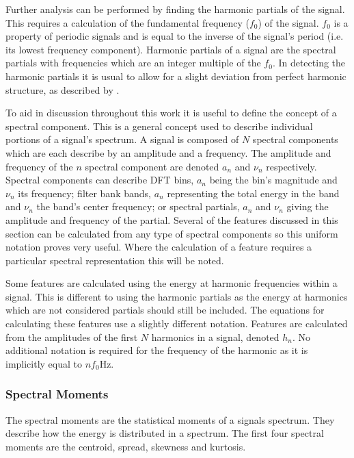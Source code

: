 		Further analysis can be performed by finding the harmonic partials of the signal. This requires a
		calculation of the fundamental frequency ($f_{0}$) of the signal. $f_{0}$ is a property of periodic signals
		and is equal to the inverse of the signal's period (i.e. its lowest frequency component). Harmonic partials
		of a signal are the spectral partials with frequencies which are an integer multiple of the $f_{0}$. In
		detecting the harmonic partials it is usual to allow for a slight deviation from perfect harmonic structure,
		as described by \citet{peeters2011the}.

		To aid in discussion throughout this work it is useful to define the concept of a spectral component. This
		is a general concept used to describe individual portions of a signal's spectrum. A signal is composed of
		$N$ spectral components which are each describe by an amplitude and a frequency. The amplitude and frequency
		of the $n$ spectral component are denoted $a_{n}$ and $\nu_{n}$ respectively. Spectral components
		can describe DFT bins, $a_{n}$ being the bin's magnitude and $\nu_{n}$ its frequency; filter bank bands,
		$a_{n}$ representing the total energy in the band and $\nu_{n}$ the band's center frequency; or spectral
		partials, $a_{n}$ and $\nu_{n}$ giving the amplitude and frequency of the partial. Several of the features
		discussed in this section can be calculated from any type of spectral components so this uniform notation
		proves very useful. Where the calculation of a feature requires a particular spectral representation this
		will be noted.

		Some features are calculated using the energy at harmonic frequencies within a signal. This is different to
		using the harmonic partials as the energy at harmonics which are not considered partials should still be
		included. The equations for calculating these features use a slightly different notation. Features
		are calculated from the amplitudes of the first $N$ harmonics in a signal, denoted $h_{n}$. No additional
		notation is required for the frequency of the harmonic as it is implicitly equal to $nf_{0}$Hz.

		\subsubsection*{Spectral Moments}

			The spectral moments are the statistical moments of a signals spectrum. They describe how the energy
			is distributed in a spectrum. The first four spectral moments are the centroid, spread, skewness and
			kurtosis.

